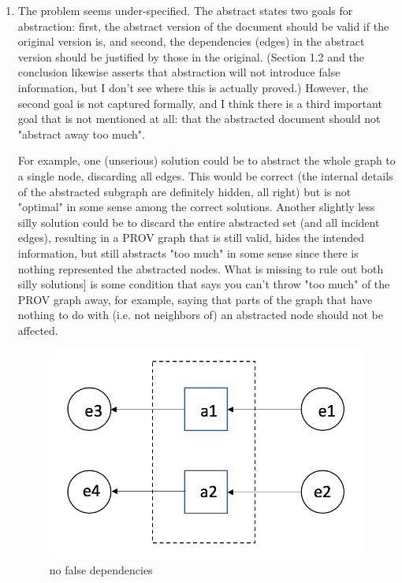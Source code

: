 \documentclass{article}
\begin{document}
\begin{enumerate}
\item The problem seems under-specified.  The abstract states two goals for abstraction: first, the abstract version of the document should be valid if the original version is, and second, the dependencies (edges) in the abstract version should be justified by those in the original.  (Section 1.2 and the conclusion likewise asserts that abstraction will not introduce false information, but I don't see where this is actually proved.) However, the second goal is not captured formally, and I think there is a third important goal that is not mentioned at all: that the abstracted document should not "abstract away too much".

  
For example, one (unserious) solution could be to abstract the whole graph to a single node, discarding all edges.  This would be correct (the internal details of the abstracted subgraph are definitely hidden, all right) but is not "optimal" in some sense among the correct solutions.  Another slightly less silly solution could be to discard the entire abstracted set (and all incident edges), resulting in a PROV graph that is still valid, hides the intended information, but still abstracts "too much" in some sense since there is nothing represented the abstracted nodes.  What is missing to rule out both silly solutions] is some condition that says you can't throw "too much" of the PROV graph away, for example, saying that parts of the graph that have nothing to do with (i.e. not neighbors of) an abstracted node should not be affected.  



\begin{figure}
  \centering
  \includegraphics[scale=0.3]{example1.png}
  \caption{  \label{fig:example1} no false dependencies}
\end{figure}


\end{enumerate}
\end{document}
